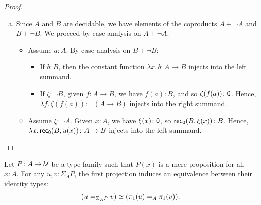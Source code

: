 \begin{proof}
\begin{enumerate}[a), font=\upshape]
\begin{enumerate}[a), font=\upshape]
\begin{itemize}
                \item If $\zeta\colon\neg B$, then $\zeta\circ\pi_2\colon\neg(A\times B)$ injects into the right summand.
            \end{itemize}
            \item If $\xi\colon\neg A$, then $\xi\circ\pi_1\colon\neg(A\times B)$ injects into the right summand.
        \end{enumerate}
        
        \item Since $A$ and $B$ are decidable, we have elements of the coproducts $A+\neg A$ and $B+\neg B$. We proceed by case analysis on $A+\neg A$:
        \begin{itemize}
            \item Assume $a\colon A$. By case analysis on $B+\neg B$:
            \begin{itemize}
                \item If $b\colon B$, then the constant function $\lambda x.\,b\colon A\to B$ injects into the left summand.
                \item If $\zeta\colon\neg B$, given $f\colon A\to B$, we have $f(a)\colon B$, and so $\zeta(f(a))\colon\fun0$. Hence, $\lambda f.\,\zeta(f(a))\colon\neg(A\to B)$ injects into the right summand.
            \end{itemize}
            
            \item Assume $\xi\colon\neg A$. Given $x\colon A$, we have $\xi(x)\colon\fun0$, so $\fun{rec}_{\fun0}(B,\xi(x))\colon B$. Hence, $\lambda x.\,\fun{rec}_{\fun0}(B,u(x))\colon A\to B$ injects into the left summand.
        \end{itemize}
    \end{enumerate}
\end{proof}

\begin{lem}\label{lem:total-space-with-mere-proposition-fibers}
    Let\/ $P\colon A\to\univ$ be a type family such that\/ $P(x)$ is a mere proposition for all\/ $x\colon A$. For any\/ $u,v\colon\Sigma_AP$, the first projection induces an equivalence between their identity types:
    \[
        (u\mathrel{=_{\Sigma_AP}}v)\simeq(\pi_1(u)\mathrel{=_{A}}\pi_1(v)).
    \]
\end{lem}

